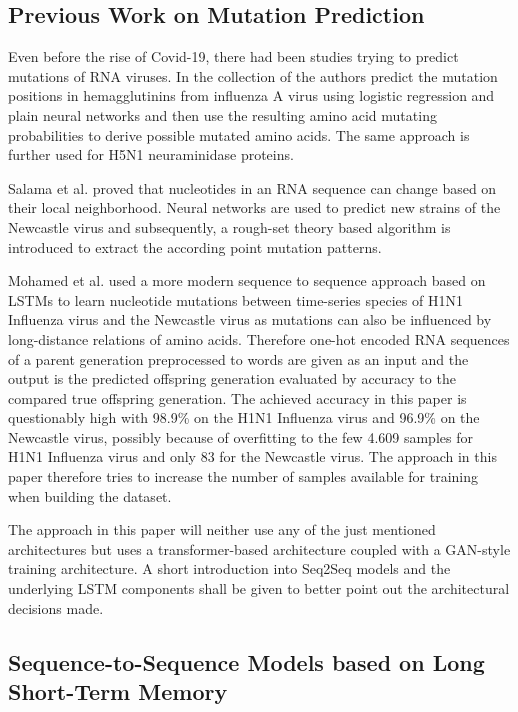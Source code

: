 \subsection{Previous Work on Mutation Prediction} \label{fundamentalsE}

Even before the rise of Covid-19, there had been studies trying to predict mutations of \ac{RNA} viruses. In the collection of \cite{Yan2007, Wu2007, Wu2008} the authors predict the mutation positions in hemagglutinins from influenza A virus using logistic regression and plain neural networks and then use the resulting amino acid mutating probabilities to derive possible mutated amino acids. The same approach is further used for H5N1 neuraminidase proteins. 

Salama et al. \cite{Salama2016} proved that nucleotides in an \ac{RNA} sequence can change based on their local neighborhood. Neural networks are used to predict new strains of the Newcastle virus and subsequently, a rough-set theory based algorithm is introduced to extract the according point mutation patterns. 

Mohamed et al. \cite{Mohamed2021} used a more modern sequence to sequence approach based on \acp{LSTM} to learn nucleotide mutations between time-series species of H1N1 Influenza virus and the Newcastle virus as mutations can also be influenced by long-distance relations of amino acids. Therefore one-hot encoded \ac{RNA} sequences of a parent generation preprocessed to words are given as an input and the output is the predicted offspring generation evaluated by accuracy to the compared true offspring generation. The achieved accuracy in this paper is questionably high with 98.9\% on the H1N1 Influenza virus and 96.9\% on the Newcastle virus, possibly because of overfitting to the few 4.609 samples for H1N1 Influenza virus and only 83 for the Newcastle virus. The approach in this paper therefore tries to increase the number of samples available for training when building the dataset. 

\vspace{0.5cm}
The approach in this paper will neither use any of the just mentioned architectures but uses a transformer-based architecture coupled with a \ac{GAN}-style training architecture. A short introduction into \ac{Seq2Seq} models and the underlying \ac{LSTM} components shall be given to better point out the architectural decisions made. 

\subsection{Sequence-to-Sequence Models based on Long Short-Term Memory} \label{fundamentalsF}

